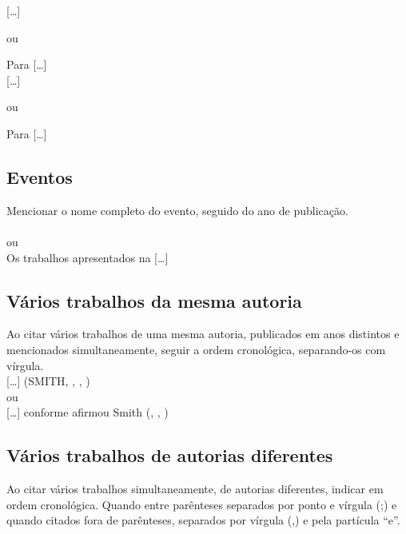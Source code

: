 [\ldots] \cite{Bagnato2018}

ou 

Para  [\ldots] \\


[\ldots] \cite{Rocha2017}

ou 

Para  [\ldots] \\


\subsection{Eventos}

Mencionar o nome completo do evento, seguido do ano de publicação.\\

\cite{reuniao1985}\\

ou\\

Os trabalhos apresentados na  [\ldots]\\

\subsection{Vários trabalhos da mesma autoria}

Ao citar vários trabalhos de uma mesma autoria, publicados em anos distintos e mencionados simultaneamente, seguir a ordem cronológica, separando-os com vírgula.\\

[\ldots] (SMITH, \citeyear{Smith1990}, \citeyear{Smith1999}, \citeyear{Smith2002}) \\

ou\\

[\ldots] conforme afirmou Smith (\citeyear{Smith1990}, \citeyear{Smith1999}, \citeyear{Smith2002})\\


\subsection{Vários trabalhos de autorias diferentes}

Ao citar vários trabalhos simultaneamente, de autorias diferentes, indicar
em ordem cronológica. Quando entre parênteses separados por ponto e
vírgula (;) e quando citados fora de parênteses, separados por vírgula (,) e pela
partícula “e”.\\

